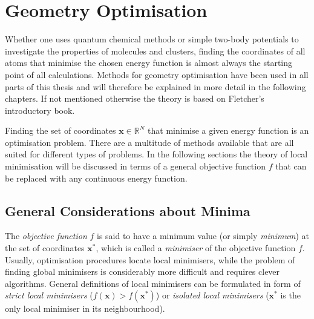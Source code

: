 \chapter{Geometry Optimisation}
\label{sec:geometryoptimisation}

Whether one uses quantum chemical methods or simple two-body potentials to
investigate the properties of molecules and clusters, finding the coordinates
of all atoms that minimise the chosen energy function is almost always the
starting point of all calculations.  Methods for geometry optimisation have
been used in all parts of this thesis and will therefore be explained in more detail
in the following chapters. If not mentioned otherwise the theory is based on
Fletcher's\autocite{Fletcher_Practicalmethodsoptimization_1987} introductory
book.

Finding the set of coordinates $\mathbf{x}\in\mathbb{R}^N$ that minimise a given energy
function is an optimisation problem. There are a multitude of methods available
that are all suited for different types of problems. In the following sections
the theory of local minimisation will be discussed in terms of a general
objective function $f$ that can be replaced with any continuous energy
function.

\section{General Considerations about Minima}
\label{sec:GeneralRemarksAboutMinima}

The \textit{objective function} $f$ is said to have a minimum value (or simply
\textit{minimum}) at the set of coordinates $\mathbf{x^*}$, which is called a
\textit{minimiser} of the objective function $f$. Usually, optimisation
procedures locate local minimisers, while the problem of finding global
minimisers is considerably more difficult and requires clever algorithms.
General definitions of local minimisers can be formulated in form of
\textit{strict local minimisers} ($f(\mathbf{x})>f(\mathbf{x^*})$) or
\textit{isolated local minimisers} ($\mathbf{x^*}$ is the only local minimiser
in its neighbourhood).

